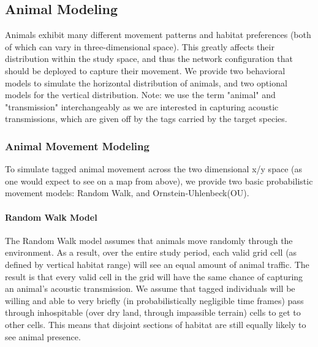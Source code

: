 \subsection{Animal Modeling}
\label{animalModeling}
Animals exhibit many different movement patterns and habitat preferences (both of which can vary in three-dimensional space).  This greatly affects their distribution within the study space, and thus the network configuration that should be deployed to capture their movement.  We provide two behavioral models to simulate the horizontal distribution of animals, and two optional models for the vertical distribution.  Note: we use the term "animal" and "transmission" interchangeably as we are interested in capturing acoustic transmissions, which are given off by the tags carried by the target species.


\subsubsection{Animal Movement Modeling}
\label{animalMovementModel}
To simulate tagged animal movement across the two dimensional x/y space (as one would expect to see on a map from above), we provide two basic probabilistic movement models: Random Walk, and Ornstein-Uhlenbeck(OU).  

\paragraph{Random Walk Model}
\label{randomWalkModel}
The Random Walk model assumes that animals move randomly through the environment.  As a result, over the entire study period, each valid grid cell (as defined by vertical habitat range) will see an equal amount of animal traffic.  The result is that every valid cell  in the grid will have the same chance of capturing an animal's acoustic transmission.  We assume that tagged individuals will be willing and able to very briefly (in probabilistically negligible time frames) pass through inhospitable (over dry land, through impassible terrain) cells to get to other cells.  This means that disjoint sections of habitat are still equally likely to see animal presence.

